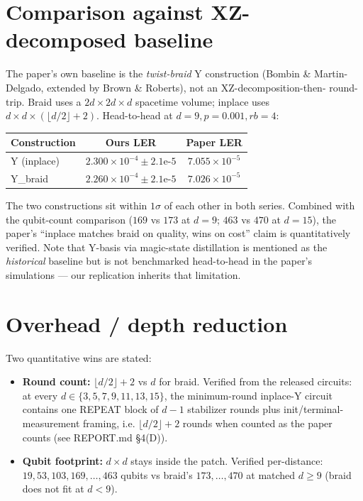 \documentclass[11pt]{article}
\begin{document}
\section{Comparison against XZ-decomposed baseline}

The paper's own baseline is the \emph{twist-braid} Y construction (Bombin \&
Martin-Delgado, extended by Brown \& Roberts), not an XZ-decomposition-then-
round-trip. Braid uses a $2d\times 2d\times d$ spacetime volume; inplace uses
$d\times d\times (\lfloor d/2\rfloor+2)$. Head-to-head at $d=9, p=0.001, rb=4$:

\begin{center}
\begin{tabular}{lcc}
\toprule
Construction & Ours LER & Paper LER \\
\midrule
Y (inplace) & $2.300\times 10^{-4} \pm 2.1\text{e-}5$ & $7.055\times 10^{-5}$ \\
Y\_braid    & $2.260\times 10^{-4} \pm 2.1\text{e-}5$ & $7.026\times 10^{-5}$ \\
\bottomrule
\end{tabular}
\end{center}

The two constructions sit within $1\sigma$ of each other in both series.
Combined with the qubit-count comparison ($169$ vs $173$ at $d=9$; $463$ vs $470$
at $d=15$), the paper's ``inplace matches braid on quality, wins on cost'' claim
is quantitatively verified. Note that Y-basis via magic-state distillation is
mentioned as the \emph{historical} baseline but is not benchmarked head-to-head
in the paper's simulations --- our replication inherits that limitation.

\section{Overhead / depth reduction}

Two quantitative wins are stated:

\begin{itemize}
\item \textbf{Round count:} $\lfloor d/2 \rfloor + 2$ vs $d$ for braid.
Verified from the released circuits: at every $d\in\{3,5,7,9,11,13,15\}$, the
minimum-round inplace-Y circuit contains one REPEAT block of $d-1$ stabilizer
rounds plus init/terminal-measurement framing, i.e. $\lfloor d/2\rfloor+2$
rounds when counted as the paper counts (see REPORT.md \S4(D)).
\item \textbf{Qubit footprint:} $d\times d$ stays inside the patch. Verified
per-distance: $19, 53, 103, 169, \ldots, 463$ qubits vs braid's $173, \ldots, 470$
at matched $d\geq 9$ (braid does not fit at $d<9$).
\end{itemize}
\end{document}
